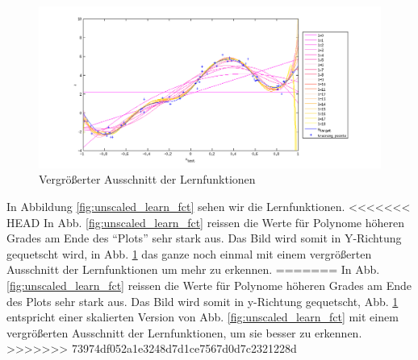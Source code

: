 \begin{figure}[hp!]
\begin{center}
 \includegraphics[width=1\textwidth]{./figures/1_1_1_scal_learn_fct}
 \caption[Vergrö\ss{}erter Ausschnitt der Lernfunktionen]{Vergrö\ss{}erter Ausschnitt der Lernfunktionen}
\label{fig:scal_learn_fct}
\end{center}
\end{figure}

In Abbildung \ref{fig:unscaled_learn_fct} sehen wir die Lernfunktionen.
<<<<<<< HEAD
In Abb. \ref{fig:unscaled_learn_fct} reissen die Werte für Polynome höheren Grades am Ende des ``Plots'' sehr stark aus.
 Das Bild wird somit in Y-Richtung gequetscht wird, in Abb. \ref{fig:scal_learn_fct} das ganze noch einmal mit einem  vergrö\ss{}erten Ausschnitt der Lernfunktionen um mehr zu erkennen.
=======
In Abb. \ref{fig:unscaled_learn_fct} reissen die Werte für Polynome höheren Grades am Ende des Plots sehr stark aus.
Das Bild wird somit in y-Richtung gequetscht, Abb. \ref{fig:scal_learn_fct} entspricht einer skalierten Version von Abb. \ref{fig:unscaled_learn_fct} mit einem  vergrö\ss{}erten Ausschnitt der Lernfunktionen, um sie besser zu erkennen.
>>>>>>> 73974df052a1e3248d7d1ce7567d0d7c2321228d

